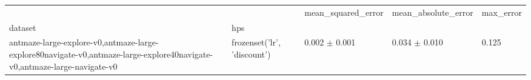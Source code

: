 \begin{tabular}{lllll}
\toprule
 &  & mean_squared_error & mean_absolute_error & max_error \\
dataset & hps &  &  &  \\
\midrule
antmaze-large-explore-v0,antmaze-large-explore80navigate-v0,antmaze-large-explore40navigate-v0,antmaze-large-navigate-v0 & frozenset({'lr', 'discount'}) & 0.002 $\pm$ 0.001 & 0.034 $\pm$ 0.010 & 0.125 \\
\cline{1-5}
\bottomrule
\end{tabular}
